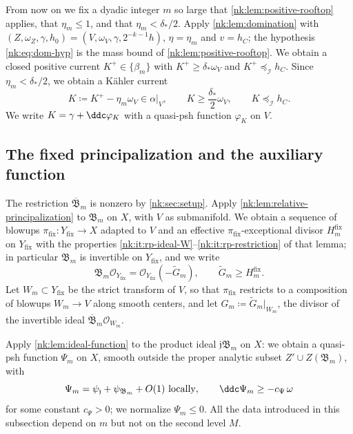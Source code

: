 From now on we fix a dyadic integer $m$ so large that
\cref{nk:lem:positive-rooftop} applies, that $\eta_m\le1$, and that
$\eta_m<\delta_*/2$.
Apply \cref{nk:lem:domination} with
$(Z,\omega_Z,\gamma,h_0)=(V,\omega_V,\gamma,2^{-k-1}h)$,
$\eta=\eta_m$ and
$v=h_C$; the hypothesis \eqref{nk:eq:dom-hyp} is the mass bound of
\cref{nk:lem:positive-rooftop}. We
obtain a closed positive current $K^+\in\{\beta_m\}$ with
$K^+\ge\delta_*\omega_V$ and $K^+\preceq_{\mathcal I} h_C$. 
Since $\eta_m<\delta_*/2$, we obtain a K\"ahler
current
\begin{equation}\label{nk:eq:def-K}
  K\coloneqq K^+-\eta_m\omega_V\in\alpha|_V,\qquad
  K\ge\frac{\delta_*}2\omega_V,\qquad
  K\preceq_{\mathcal I} h_C .
\end{equation}
We write $K=\gamma+\ddc\varphi_K$ with a quasi-psh function
$\varphi_K$ on $V$.

\subsection{The fixed principalization and the auxiliary function}\label{nk:sec:fixed-principalization}

The restriction $\overline{\mathfrak B}_m$ is nonzero by
\cref{nk:sec:setup}. Apply \cref{nk:lem:relative-principalization} to
$\mathfrak B_m$ on $X$, with $V$ as submanifold. We obtain a sequence
of blowups $\pi_{{\mathrm{fix}}}\colon Y_{{\mathrm{fix}}}\to X$ adapted to $V$ and an
effective $\pi_{{\mathrm{fix}}}$-exceptional divisor $H^{{\mathrm{fix}}}_m$ on
$Y_{{\mathrm{fix}}}$ with the properties \ref{nk:it:rp-ideal-W}--\ref{nk:it:rp-restriction}
of that lemma; in particular $\mathfrak B_m$ is invertible on $Y_{{\mathrm{fix}}}$,
and we write
\begin{equation}\label{nk:eq:def-Gm-tilde}
  \mathfrak B_m\mathcal O_{Y_{{\mathrm{fix}}}}=\mathcal O_{Y_{{\mathrm{fix}}}}(-\widetilde G_m),
  \qquad \widetilde G_m\ge H^{{\mathrm{fix}}}_m .
\end{equation}
Let $W_m\subset Y_{{\mathrm{fix}}}$ be the strict transform of $V$, so that
$\pi_{{\mathrm{fix}}}$ restricts to a composition of blowups $W_m\to V$ along
smooth centers, and let $G_m\coloneqq \widetilde G_m|_{W_m}$, the
divisor of the invertible ideal $\overline{\mathfrak B}_m\mathcal O_{W_m}$.

Apply \cref{nk:lem:ideal-function} to the product ideal
$\mathfrak j\mathfrak B_m$ on $X$: we obtain a quasi-psh function
$\Psi_m$ on $X$, smooth outside the proper analytic subset
$Z'\cup Z(\mathfrak B_m)$, with
\begin{equation}\label{nk:eq:def-Psi}
  \Psi_m=\psi_{\mathfrak j}+\psi_{\mathfrak B_m}+O(1)\ \text{locally},
  \qquad
  \ddc\Psi_m\ge-c_\Psi\,\omega
\end{equation}
for some constant $c_\Psi>0$; we normalize $\Psi_m\le0$. All the data
introduced in this subsection depend on $m$ but not on the second level
$M$.

